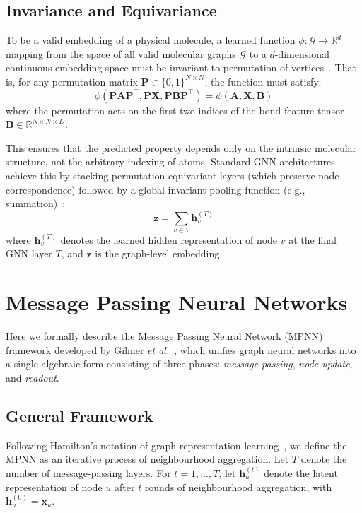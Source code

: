 \subsection{Invariance and Equivariance}
\label{sec:invariance}
To be a valid embedding of a physical molecule, a learned function $\phi: \mathcal{G} \to \mathbb{R}^d$ mapping from the space of all valid molecular graphs $\mathcal{G}$ to a $d$-dimensional continuous embedding space must be invariant to permutation of vertices~\cite{bronstein2017geometric}. That is, for any permutation matrix $\mathbf{P} \in \{0,1\}^{N \times N}$, the function must satisfy:
\begin{equation}
\phi(\mathbf{P}\mathbf{A}\mathbf{P}^\top, \mathbf{P}\mathbf{X}, \mathbf{P}\mathbf{B}\mathbf{P}^\top)
=
\phi(\mathbf{A}, \mathbf{X}, \mathbf{B})
\end{equation}
where the permutation acts on the first two indices of the bond feature tensor 
$\mathbf{B} \in \mathbb{R}^{N \times N \times D}$.

This ensures that the predicted property depends only on the intrinsic molecular structure, not the arbitrary indexing of atoms. Standard GNN architectures achieve this by stacking permutation equivariant layers (which preserve node correspondence) followed by a global invariant pooling function (e.g., summation)~\cite{zaheer2017deep, xu2018powerful}:
\begin{equation}
    \mathbf{z} = \sum_{v \in V} \mathbf{h}_v^{(T)}
\end{equation}
where $\mathbf{h}_v^{(T)}$ denotes the learned hidden representation of node $v$ at the final GNN layer $T$, and $\mathbf{z}$ is the graph-level embedding.

\section{Message Passing Neural Networks}
\label{sec:mpnn}

Here we formally describe the Message Passing Neural Network (MPNN) framework developed by Gilmer \textit{et al.}~\cite{gilmer2017neural}, which unifies graph neural networks into a single algebraic form consisting of three phases: \textit{message passing}, \textit{node update}, and \textit{readout}.

\subsection{General Framework}
Following Hamilton's notation of graph representation learning~\cite{hamilton2020graph}, we define the MPNN as an iterative process of neighbourhood aggregation. Let $T$ denote the number of message-passing layers. 
For $t = 1, \dots, T$, let $\mathbf{h}_u^{(t)}$ denote the latent representation of node $u$ after $t$ rounds of neighbourhood aggregation, with $\mathbf{h}_u^{(0)} = \mathbf{x}_u$.

